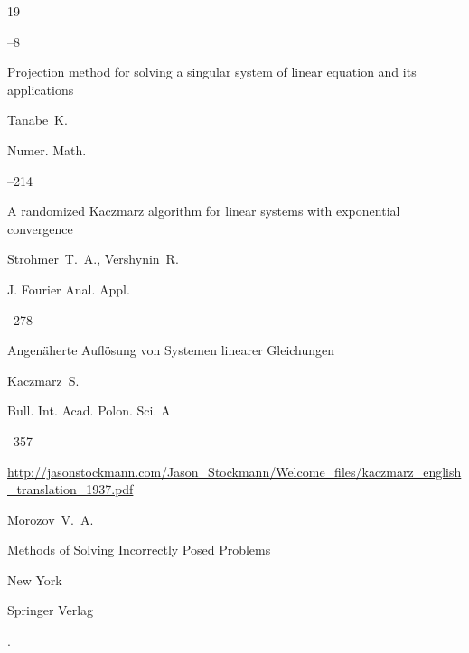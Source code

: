 \begin{thebibliography}{19}

--8




\paper Projection method for solving a singular system of linear equation and its applications

\by Tanabe~K.

\jour Numer. Math.




--214






\paper A randomized Kaczmarz algorithm for linear systems with exponential convergence

\by Strohmer~T.~A., Vershynin~R.

\jour  J. Fourier Anal. Appl.



--278




\paper Angen\"aherte Aufl\"osung von Systemen linearer Gleichungen

\by Kaczmarz~S.

\jour Bull. Int. Acad. Polon. Sci. A 



--357


\elink \url{http://jasonstockmann.com/Jason_Stockmann/Welcome_files/kaczmarz_english_translation_1937.pdf}






\by Morozov~V.~A.

\book Methods of Solving Incorrectly Posed Problems

\publaddr New York

\publ Springer Verlag


.


\end{thebibliography}
